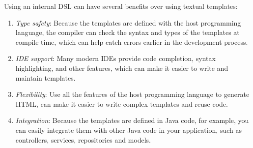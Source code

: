 Using an internal DSL can have several benefits over using textual templates:
\begin{enumerate}
  \item \emph{Type safety}: Because the templates are defined with the host
  programming language, the compiler can check the syntax and types of the
  templates at compile time, which can help catch errors earlier in the
  development process.

  \item \emph{IDE support}: Many modern IDEs provide code completion, syntax
  highlighting, and other features, which can make it easier to write and
  maintain templates.
  
  \item \emph{Flexibility}: Use all the features of the host programming language
  to generate HTML, can make it easier to write complex templates and reuse code.
  
  \item \emph{Integration}: Because the templates are defined in Java code, for
  example, you can easily integrate them with other Java code in your
  application, such as controllers, services, repositories and models.
  
\end{enumerate}

